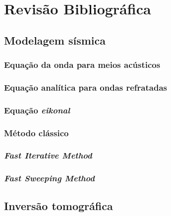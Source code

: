 \chapter{Revisão Bibliográfica}
\label{ch:revisaobibliografica}

\section{Modelagem sísmica}




\subsection*{Equação da onda para meios acústicos}




\subsection*{Equação analítica para ondas refratadas}




\subsection*{Equação \textit{eikonal}}




\subsection*{Método clássico}




\subsection*{\textit{Fast Iterative Method}}




\subsection*{\textit{Fast Sweeping Method}}




\section{Inversão tomográfica}

